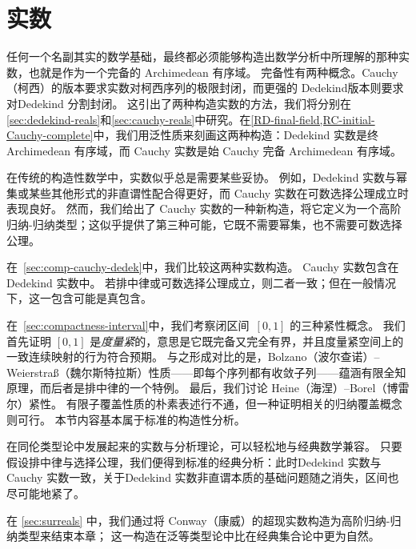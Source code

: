 \chapter{实数}
\label{cha:real-numbers}

%
任何一个名副其实的数学基础，最终都必须能够构造出数学分析中所理解的那种实数，也就是作为一个完备的 Archimedean 有序域。
%
完备性有两种概念。Cauchy（柯西）的版本要求实数对柯西序列的极限封闭，而更强的 Dedekind版本则要求对Dedekind 分割封闭。
这引出了两种构造实数的方法，我们将分别在\cref{sec:dedekind-reals}和\cref{sec:cauchy-reals}中研究。在\cref{RD-final-field,RC-initial-Cauchy-complete}中，我们用泛性质来刻画这两种构造：Dedekind 实数是终 Archimedean 有序域，而 Cauchy 实数是始 Cauchy 完备 Archimedean 有序域。

在传统的构造性数学中，实数似乎总是需要某些妥协。
例如，Dedekind 实数与幂集或某些其他形式的非直谓性配合得更好，而 Cauchy 实数在可数选择公理成立时表现良好。
然而，我们给出了 Cauchy 实数的一种新构造，将它定义为一个高阶归纳-归纳类型；这似乎提供了第三种可能，它既不需要幂集，也不需要可数选择公理。

在~\cref{sec:comp-cauchy-dedek}中，我们比较这两种实数构造。
Cauchy 实数包含在Dedekind 实数中。
若排中律或可数选择公理成立，则二者一致；但在一般情况下，这一包含可能是真包含。

在~\cref{sec:compactness-interval}中，我们考察闭区间~$[0,1]$ 的三种紧性概念。
我们首先证明 $[0,1]$ 是\emph{度量紧}的，意思是它既完备又完全有界，并且度量紧空间上的一致连续映射的行为符合预期。
与之形成对比的是，Bolzano（波尔查诺）--Weierstra\ss{}（魏尔斯特拉斯）性质——即每个序列都有收敛子列——蕴涵有限全知原理，而后者是排中律的一个特例。
最后，我们讨论 Heine（海涅）--Borel（博雷尔）紧性。
有限子覆盖性质的朴素表述行不通，但一种证明相关的归纳覆盖概念则可行。
本节内容基本属于标准的构造性分析。

在同伦类型论中发展起来的实数与分析理论，可以轻松地与经典数学兼容。
只要假设排中律与选择公理，我们便得到标准的经典分析：此时Dedekind 实数与 Cauchy 实数一致，关于Dedekind 实数非直谓本质的基础问题随之消失，区间也尽可能地紧了。

在 \cref{sec:surreals} 中，我们通过将 Conway（康威）的超现实数构造为高阶归纳-归纳类型来结束本章；
这一构造在泛等类型论中比在经典集合论中更为自然。

